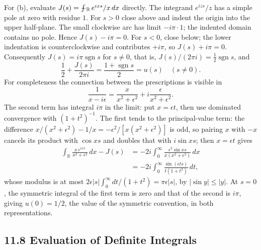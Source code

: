 For (b), evaluate
$J(s)=\PVint_{\mathbb R}e^{ixs}/x\,dx$ directly. The integrand
$e^{izs}/z$ has a simple pole at zero with residue $1$. For $s>0$
close above and indent the origin into the upper half-plane.
The small clockwise arc has limit $-i\pi\cdot1$; the indented domain
contains no pole. Hence $J(s)-i\pi=0$. For $s<0$, close below;
the lower indentation is counterclockwise and contributes $+i\pi$,
so $J(s)+i\pi=0$. Consequently $J(s)=i\pi\operatorname{sgn}s$ for
$s\ne0$, that is, $J(s)/(2\pi i)=\frac12\operatorname{sgn}s$, and
\[
\boxed{\frac12+\frac{J(s)}{2\pi i}
=\frac{1+\operatorname{sgn}s}{2}=u(s)\quad(s\ne0)}.
\]
For completeness the connection between the prescriptions is visible in
\[
\frac1{x-i\epsilon}
=\frac{x}{x^2+\epsilon^2}
+i\frac{\epsilon}{x^2+\epsilon^2}.
\]
The second term has integral $i\pi$ in the limit: put
$x=\epsilon t$, then use dominated convergence with $(1+t^2)^{-1}$.
The first tends to the principal-value term: the difference
$x/(x^2+\epsilon^2)-1/x=-\epsilon^2/[x(x^2+\epsilon^2)]$ is odd, so
pairing $x$ with $-x$ cancels its product with $\cos xs$ and doubles
that with $i\sin xs$; then $x=\epsilon t$ gives
\[
\begin{aligned}
\int_{\mathbb R}\frac{x\,e^{ixs}}{x^2+\epsilon^2}\,dx-J(s)
&=-2i\int_0^\infty\frac{\epsilon^2\sin xs}{x(x^2+\epsilon^2)}\,dx\\
&=-2i\int_0^\infty\frac{\sin(\epsilon ts)}{t(1+t^2)}\,dt,
\end{aligned}
\]
whose modulus is at most
$2\epsilon|s|\int_0^\infty dt/(1+t^2)=\pi\epsilon|s|$, by
$|\sin y|\le|y|$. At $s=0$,
the symmetric integral of the first term is zero and that of the second
is $i\pi$, giving $u(0)=1/2$, the value of the symmetric convention, in
both representations.

\subsection*{11.8 Evaluation of Definite Integrals}


